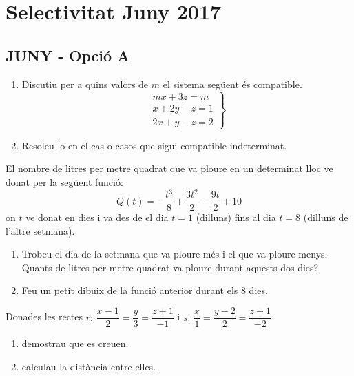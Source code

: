 \documentclass[11pt, a4paper, pdf]{book}
\begin{document}
 
 
\chapter*{Selectivitat  Juny 2017}



\section*{JUNY - Opció A} 

\begin{mylist}
	
\item \begin{enumerate}
	\item Discutiu per a quins valors de $m$ el sistema següent és compatible.
	\[  \left. \begin{array}{ll} mx+3z=m \\ x+2y-z=1 \\ 2x+y-z=2  \end{array} \right\} \]
	
	\item Resoleu-lo en el cas o casos que sigui compatible indeterminat.

\end{enumerate}

\item El nombre de litres per metre quadrat que va ploure en un determinat lloc ve donat per la següent funció:
\[  Q(t) =-\frac{t^3}{8}+ \frac{3t^2}{2}-\frac{9t}{2} +10 \]
	on $t$ ve donat en dies i va des de el dia $t=1$ (dilluns) fins al dia $t=8$ (dilluns de l'altre setmana).
	\begin{enumerate}
		\item Trobeu el dia de la setmana que va ploure més  i el que va ploure menys. Quants de litres per metre quadrat
		va ploure durant aquests dos dies? 
		
		\item Feu un petit dibuix  de la funció anterior durant els 8 dies. 
	\end{enumerate} 



\item Donades les rectes $r:\, \dfrac{x-1}{2}=\dfrac{y}{3}=\dfrac{z+1}{-1}$  i $s:\, \dfrac{x}{1}=\dfrac{y-2}{2}=\dfrac{z+1}{-2}$
\begin{enumerate}
	\item demostrau que es creuen.
	\item calculau la distància entre elles. 
\end{enumerate}



\end{mylist}
\end{document}
